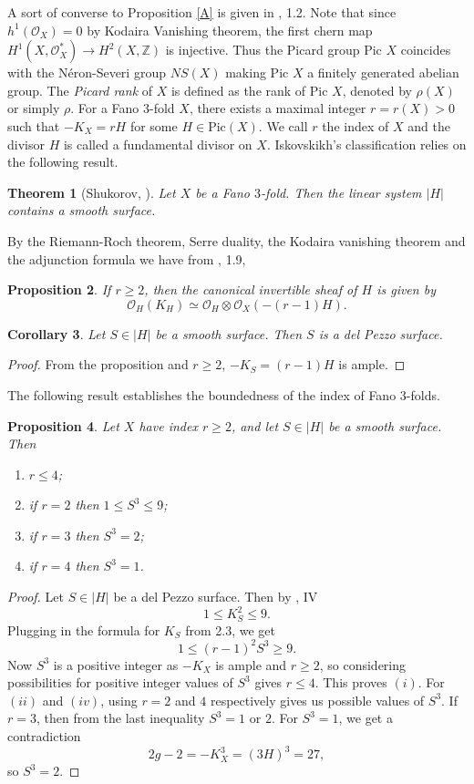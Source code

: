 \documentclass[11pt]{amsart}
\theoremstyle{plain}
\newtheorem{theorem}{Theorem}[section]
\newtheorem{corollary}[theorem]{Corollary}
\newtheorem{proposition}[theorem]{Proposition}
\theoremstyle{definition}
\theoremstyle{expl}
\begin{document}
A sort of converse to Proposition \ref{A} is given in \cite{Isk78}, 1.2.
Note that since $h^1(\mathcal{O}_X)=0$ by Kodaira Vanishing theorem, the first chern map $H^1(X,\mathcal{O}_X^*) \to H^2(X,\mathbb{Z})$ is injective. Thus the Picard group Pic $X$ coincides with the N\'{e}ron-Severi group $NS(X)$ making Pic $X$ a finitely generated abelian group. The \textit{Picard rank} of $X$ is defined as the rank of Pic $X$, denoted by $\rho(X)$ or simply $\rho$. 
\medbreak
For a Fano $3$-fold $X$, there exists a maximal integer $r = r(X) >0$ such that $-K_X = rH$ for some $H \in \text{Pic}(X)$. We call $r$ the index of $X$ and the divisor $H$ is called a fundamental divisor on $X$.
Iskovskikh's classification relies on the following result.
\begin{theorem}[Shukorov, \cite{Sokudivisor}]
\label{B}
Let $X$ be a Fano $3$-fold. Then the linear system $|H|$ contains a smooth surface.
\end{theorem}
By the Riemann-Roch theorem, Serre duality, the Kodaira vanishing theorem and the adjunction formula we have from \cite{Isk77}, 1.9,
\begin{proposition}
    If $r \geq 2$, then the canonical invertible sheaf of $H$ is given by 
    \[
    \mathcal{O}_H(K_{H}) \simeq \mathcal{O}_H \otimes \mathcal{O}_X(-(r-1)H).
    \]
\end{proposition}
\begin{corollary}
 Let $S \in |H|$ be a smooth surface. Then $S$ is a del Pezzo surface. 	
\end{corollary}
\begin{proof}
 From the proposition and $r\geq 2$, $-K_S = (r-1)H$ is ample. 
\end{proof}
The following result establishes the boundedness of the index of Fano $3$-folds. 
\begin{proposition}
    Let $X$ have index $r\geq 2$, and let $S \in |H|$ be a smooth surface. Then 
    \begin{enumerate}
        \item[(i)] $r \leq 4$;
        \item[(ii)] if $r=2$ then $1 \leq S^3 \leq 9$;
        \item[(ii)] if $r=3$ then $S^3=2$;
        \item[(iv)] if $r=4$ then $S^3=1$.
    \end{enumerate}
\end{proposition}
\begin{proof}
	Let $S \in |H|$ be a del Pezzo surface. Then by \cite{Manin}, IV 
   \[ 1\leq K_S^2 \leq 9.\]
Plugging in the formula for $K_S$ from 2.3, we get 
\[
1 \leq (r-1)^2 S^3 \geq 9.
\]   
Now $S^3$ is a positive integer	as $-K_X$ is ample and $r\geq 2$, so considering possibilities for positive integer values of $S^3$ gives $r\leq 4$. This proves $(i)$. For $(ii)$ and $(iv)$, using $r=2$ and $4$ respectively gives us possible values of $S^3$. If $r=3$, then from the last inequality $S^3 =1$ or $2$. For $S^3=1$, we get a contradiction
\[
2g-2 = -K_X^3 = (3H)^3 = 27,
\]
so $S^3=2$.		
\end{proof}
\end{document}
